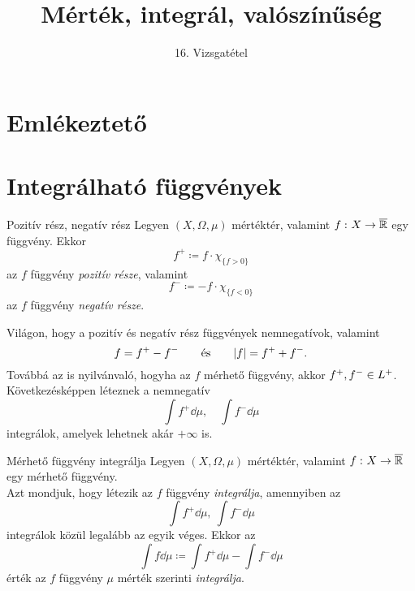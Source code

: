 \documentclass[
]{elteikthesis}[2024/04/26]
\title{Mérték, integrál, valószínűség} %
\subtitle{16. Vizsgatétel}
\begin{document}
	
	
	\section{Emlékeztető}
	
	\section{Integrálható függvények}
	
	\begin{definition}{Pozitív rész, negatív rész}
		Legyen \( (X, \Omega, \mu) \) mértéktér,
		valamint  \( f \,\colon X \to \overline{ \mathbb{R} } \) egy függvény.
		Ekkor
		\[
			f^+ \coloneq f {\cdot} \chi_{\{ f > 0 \}}
		\]
		az \( f \) függvény \emph{pozitív része}, valamint
		\[
			f^- \coloneq -f {\cdot} \chi_{\{ f < 0 \}}
		\]
		az \( f \) függvény \emph{negatív része}.
	\end{definition}
	
	Világon, hogy a pozitív és negatív rész függvények nemnegatívok, valamint
	\[
		f = f^+ - f^-
		\qquad \text{és} \qquad
		\abs{f} = f^+ + f^-.
	\]
	Továbbá az is nyilvánvaló, hogyha az \( f \) mérhető függvény, 
	akkor \( f^+, f^- \in L^+ \).
	Következésképpen léteznek a nemnegatív
	\[
		\int f^+ \dd{\mu}, \quad \int f^- \dd{\mu}
	\]
	integrálok, amelyek lehetnek akár \( +\infty \) is.
	
	\begin{definition}{Mérhető függvény integrálja}{}
		Legyen \( (X, \Omega, \mu) \) mértéktér, 
		valamint \( f \,\colon X \to \overline{ \mathbb{R} } \) egy mérhető függvény.\\[3pt]
		Azt mondjuk, hogy létezik az \( f \) függvény \emph{integrálja}, amennyiben az
		\[
			\int f^+ \dd{\mu}, \ \int f^- \dd{\mu}
		\]
		integrálok közül legalább az egyik véges. Ekkor az
		\[
			\int f \dd{\mu} \coloneq
			\int f^+ \dd{\mu} - \int f^- \dd{\mu}
		\]
		érték az \( f \) függvény \( \mu \) mérték szerinti \emph{integrálja}.
	\end{definition}
	
\end{document}
